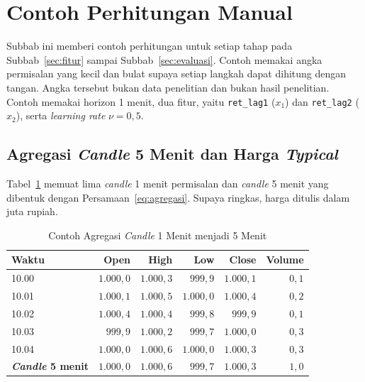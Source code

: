 \section{Contoh Perhitungan Manual}
\label{sec:manual}
Subbab ini memberi contoh perhitungan untuk setiap tahap pada
Subbab~\ref{sec:fitur} sampai Subbab~\ref{sec:evaluasi}. Contoh memakai angka
permisalan yang kecil dan bulat supaya setiap langkah dapat dihitung dengan
tangan. Angka tersebut bukan data penelitian dan bukan hasil penelitian.
Contoh memakai horizon 1 menit, dua fitur, yaitu \texttt{ret\_lag1} ($x_1$)
dan \texttt{ret\_lag2} ($x_2$), serta \textit{learning rate} $\nu = 0{,}5$.

\subsection{Agregasi \textit{Candle} 5 Menit dan Harga \textit{Typical}}
Tabel~\ref{tab:man-agregasi} memuat lima \textit{candle} 1 menit permisalan dan
\textit{candle} 5 menit yang dibentuk dengan Persamaan~\eqref{eq:agregasi}.
Supaya ringkas, harga ditulis dalam juta rupiah.

\begin{table}[htbp]
  \caption{Contoh Agregasi \textit{Candle} 1 Menit menjadi 5 Menit}
  \label{tab:man-agregasi}
  \centering
  \begingroup
  \footnotesize
  \setlength{\tabcolsep}{4pt}
  \begin{tabular}{|l|r|r|r|r|r|}
    \hline
    \textbf{Waktu} & \textbf{Open} & \textbf{High} & \textbf{Low} & \textbf{Close} & \textbf{Volume} \\
    \hline
    10.00 & $1.000{,}0$ & $1.000{,}3$ & $999{,}9$ & $1.000{,}1$ & $0{,}1$ \\
    10.01 & $1.000{,}1$ & $1.000{,}5$ & $1.000{,}0$ & $1.000{,}4$ & $0{,}2$ \\
    10.02 & $1.000{,}4$ & $1.000{,}4$ & $999{,}8$ & $999{,}9$ & $0{,}1$ \\
    10.03 & $999{,}9$ & $1.000{,}2$ & $999{,}7$ & $1.000{,}0$ & $0{,}3$ \\
    10.04 & $1.000{,}0$ & $1.000{,}6$ & $1.000{,}0$ & $1.000{,}3$ & $0{,}3$ \\
    \textbf{\textit{Candle} 5 menit} & $1.000{,}0$ & $1.000{,}6$ & $999{,}7$ & $1.000{,}3$ & $1{,}0$ \\
    \hline
  \end{tabular}
  \endgroup
\end{table}

